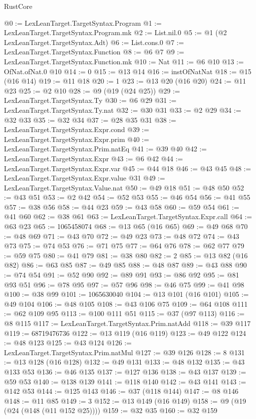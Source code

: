 \begin{lexlean}{RustCore}
\begin{coremodule}
@0 := LexLeanTarget.TargetSyntax.Program
@1 := LexLeanTarget.TargetSyntax.Program.mk
@2 := List.nil.{0}
@5 := @1 (@2 LexLeanTarget.TargetSyntax.Adt)
@6 := List.cons.{0}
@7 := LexLeanTarget.TargetSyntax.Function
@8 := @6 @7
@9 := LexLeanTarget.TargetSyntax.Function.mk
@10 := Nat
@11 := @6 @10
@13 := OfNat.ofNat.{0} @10
@14 := 0
@15 := @13 @14
@16 := instOfNatNat
@18 := @15 (@16 @14)
@19 := @11 @18
@20 := 1
@23 := @13 @20 (@16 @20)
@24 := @11 @23
@25 := @2 @10
@28 := @9 (@19 (@24 @25))
@29 := LexLeanTarget.TargetSyntax.Ty
@30 := @6 @29
@31 := LexLeanTarget.TargetSyntax.Ty.nat
@32 := @30 @31
@33 := @2 @29
@34 := @32 @33
@35 := @32 @34
@37 := @28 @35 @31
@38 := LexLeanTarget.TargetSyntax.Expr.cond
@39 := LexLeanTarget.TargetSyntax.Expr.prim
@40 := LexLeanTarget.TargetSyntax.Prim.natEq
@41 := @39 @40
@42 := LexLeanTarget.TargetSyntax.Expr
@43 := @6 @42
@44 := LexLeanTarget.TargetSyntax.Expr.var
@45 := @44 @18
@46 := @43 @45
@48 := LexLeanTarget.TargetSyntax.Expr.value @31
@49 := LexLeanTarget.TargetSyntax.Value.nat
@50 := @49 @18
@51 := @48 @50
@52 := @43 @51
@53 := @2 @42
@54 := @52 @53
@55 := @46 @54
@56 := @41 @55
@57 := @38 @56
@58 := @44 @23
@59 := @43 @58
@60 := @59 @54
@61 := @41 @60
@62 := @38 @61
@63 := LexLeanTarget.TargetSyntax.Expr.call
@64 := @63 @23
@65 := 1065458074
@68 := @13 @65 (@16 @65)
@69 := @49 @68
@70 := @48 @69
@71 := @43 @70
@72 := @49 @23
@73 := @48 @72
@74 := @43 @73
@75 := @74 @53
@76 := @71 @75
@77 := @64 @76
@78 := @62 @77
@79 := @59 @75
@80 := @41 @79
@81 := @38 @80
@82 := 2
@85 := @13 @82 (@16 @82)
@86 := @63 @85
@87 := @49 @85
@88 := @48 @87
@89 := @43 @88
@90 := @74 @54
@91 := @52 @90
@92 := @89 @91
@93 := @86 @92
@95 := @81 @93 @51
@96 := @78 @95
@97 := @57 @96
@98 := @46 @75
@99 := @41 @98
@100 := @38 @99
@101 := 1065630040
@104 := @13 @101 (@16 @101)
@105 := @49 @104
@106 := @48 @105
@108 := @43 @106 @75
@109 := @64 @108
@111 := @62 @109 @95
@113 := @100 @111 @51
@115 := @37 (@97 @113)
@116 := @8 @115
@117 := LexLeanTarget.TargetSyntax.Prim.natAdd
@118 := @39 @117
@119 := 68719476736
@122 := @13 @119 (@16 @119)
@123 := @49 @122
@124 := @48 @123
@125 := @43 @124
@126 := LexLeanTarget.TargetSyntax.Prim.natMul
@127 := @39 @126
@128 := 8
@131 := @13 @128 (@16 @128)
@132 := @49 @131
@133 := @48 @132
@135 := @43 @133 @53
@136 := @46 @135
@137 := @127 @136
@138 := @43 @137
@139 := @59 @53
@140 := @138 @139
@141 := @118 @140
@142 := @43 @141
@143 := @142 @53
@144 := @125 @143
@146 := @37 (@118 @144)
@147 := @8 @146
@148 := @11 @85
@149 := 3
@152 := @13 @149 (@16 @149)
@158 := @9 (@19 (@24 (@148 (@11 @152 @25))))
@159 := @32 @35
@160 := @32 @159

\end{coremodule}
\end{lexlean}
